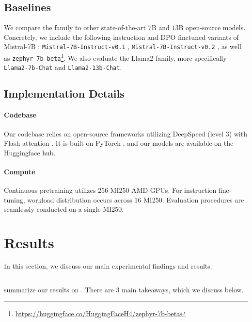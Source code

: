 \subsection{Baselines}
We compare the \ourmodel{} family to other state-of-the-art $7$B and $13$B open-source models. Concretely, we include the following instruction and DPO finetuned variants of Mistral-7B \citep{jiang2023mistral}: \texttt{Mistral-7B-Instruct-v0.1}%
, \texttt{Mistral-7B-Instruct-v0.2}
, as well as \texttt{zephyr-7b-beta}\footnote{\url{https://huggingface.co/HuggingFaceH4/zephyr-7b-beta}}. We also evaluate the Llama2 \citep{touvron2023llama} family, more specifically \texttt{Llama2-7b-Chat}%
and \texttt{Llama2-13b-Chat}.%
    
\subsection{Implementation Details}

\paragraph{Codebase} Our codebase relies on open-source frameworks \cite{shoeybi2019megatron,wolf2019huggingface,lhoest2021datasets} utilizing DeepSpeed (level 3) with Flash attention \cite{dao2022flashattention,dao2023flashattention}. It is built on PyTorch \cite{paszke2019pytorch}, and our models are available on the Huggingface hub.

\paragraph{Compute} Continuous pretraining utilizes $256$ MI250 AMD GPUs. For instruction fine-tuning, workload distribution occurs across 16 MI250. Evaluation procedures are seamlessly conducted on a single MI250.

\section{Results}

In this section, we discuss our main experimental findings and results.

\subsection{\legalbench{}}
 summarize our results on \legalbench{}. There are $3$ main takeaways, which we discuss below.

